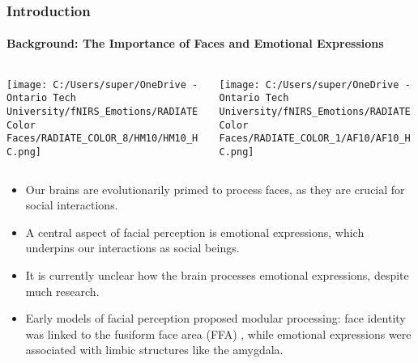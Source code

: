 \documentclass{beamer}
\begin{document}
\begin{frame}
    \frametitle{Introduction}
    \framesubtitle{Background: The Importance of Faces and Emotional Expressions}
    \begin{columns}[c]
        \begin{column}{0.3\textwidth}
            \centering
            \texttt{[image: C:/Users/super/OneDrive - Ontario Tech University/fNIRS\_Emotions/RADIATE Color Faces/RADIATE\_COLOR\_8/HM10/HM10\_HC.png]}
        \end{column}
        \begin{column}{0.3\textwidth}
            \centering
            \texttt{[image: C:/Users/super/OneDrive - Ontario Tech University/fNIRS\_Emotions/RADIATE Color Faces/RADIATE\_COLOR\_1/AF10/AF10\_HC.png]}
        \end{column}
    \end{columns}
    \begin{itemize}
        \item Our brains are evolutionarily primed to process faces, as they are crucial for social interactions.
        \item A central aspect of facial perception is emotional expressions, which underpins our interactions as social beings.
        \item It is currently unclear how the brain processes emotional expressions, despite much research. \cite{kawasaki_processing_2012}
        \item Early models of facial perception proposed modular processing: face identity was linked to the fusiform face area (FFA) \cite{kawasaki_processing_2012}, while emotional expressions were associated with limbic structures like the amygdala. \cite{sato_amygdala_2004}
    \end{itemize}
\end{frame}
\end{document}
